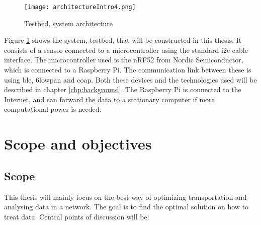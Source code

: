 \begin{figure}[ht]
    \centering
    \texttt{[image: architectureIntro4.png]}    
    \caption{Testbed, system architecture}
    \label{iotExampleArchitecture}
\end{figure}

\noindent Figure \ref{iotExampleArchitecture} shows the system, testbed, that will be constructed in this thesis. It consists of a sensor connected to a \gls{microcontroller} using the standard \gls{i2c} cable interface. The \gls{microcontroller} used is the \gls{nRF52} from Nordic Semiconductor, which is connected to a \gls{Raspberry Pi}. The communication link between these is using \gls{ble}, \gls{6lowpan} and \gls{coap}. Both these devices and the technologies used will be described in chapter \ref{chp:background}. The \gls{Raspberry Pi} is connected to the Internet, and can forward the data to a stationary computer if more computational power is needed. 












\section{Scope and objectives}

\subsection{Scope}

\noindent This thesis will mainly focus on the best way of optimizing transportation and analysing data in a network. The goal is to find the optimal solution on how to treat data. Central points of discussion will be:

